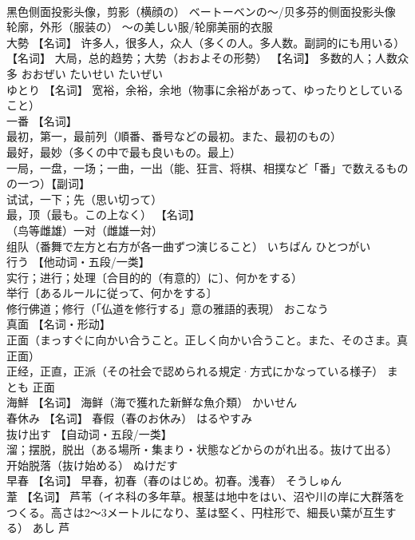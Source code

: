 \documentclass[8pt]{extreport}
\begin{document}
\begin{CJK}{UTF8}{min}
\\	黑色侧面投影头像，剪影（横顔の） ベートーベンの～/贝多芬的侧面投影头像 
\\	轮廓，外形（服装の） ～の美しい服/轮廓美丽的衣服		
\\	大勢	【名词】 许多人，很多人，众人（多くの人。多人数。副詞的にも用いる） 【名词】 大局，总的趋势；大势（おおよその形勢） 【名词】 多数的人；人数众多	おおぜい たいせい たいぜい	
\\	ゆとり	【名词】 宽裕，余裕，余地（物事に余裕があって、ゆったりとしていること）		
\\	一番	【名词】 
\\	最初，第一，最前列（順番、番号などの最初。また、最初のもの） 
\\	最好，最妙（多くの中で最も良いもの。最上） 
\\	一局，一盘，一场；一曲，一出（能、狂言、将棋、相撲など「番」で数えるものの一つ）【副词】 
\\	试试，一下；先（思い切って） 
\\	最，顶（最も。この上なく） 【名词】 
\\	（鸟等雌雄）一对（雌雄一対） 
\\	组队（番舞で左方と右方が各一曲ずつ演じること）	いちばん ひとつがい	
\\	行う	【他动词・五段/一类】 
\\	实行；进行；处理〔合目的的（有意的）に〕、何かをする） 
\\	举行〔あるルールに従って、何かをする〕 
\\	修行佛道；修行（「仏道を修行する」意の雅語的表現）	おこなう	
\\	真面	【名词・形动】 
\\	正面（まっすぐに向かい合うこと。正しく向かい合うこと。また、そのさま。真正面） 
\\	正经，正直，正派（その社会で認められる規定·方式にかなっている様子）	まとも	正面
\\	海鮮	【名词】 海鲜（海で獲れた新鮮な魚介類）	かいせん	
\\	春休み	【名词】 春假（春のお休み）	はるやすみ	
\\	抜け出す	【自动词・五段/一类】 
\\	溜；摆脱，脱出（ある場所・集まり・状態などからのがれ出る。抜けて出る） 
\\	开始脱落（抜け始める）	ぬけだす	
\\	早春	【名词】 早春，初春（春のはじめ。初春。浅春）	そうしゅん	
\\	葦	【名词】 芦苇（イネ科の多年草。根茎は地中をはい、沼や川の岸に大群落をつくる。高さは2～3メートルになり、茎は堅く、円柱形で、細長い葉が互生する）	あし	芦

\end{CJK}
\end{document}
